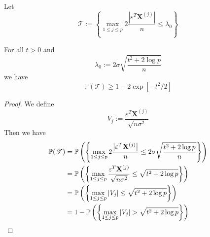 Let
$$\mathscr{T} := \left\{\max _{1 \leq j \leq p} 2 \frac{\left| \varepsilon^{T} \mathbf{X}^{(j)}\right|}{n} \leq \lambda_{0}\right\}$$

\begin{lemma}[Lemma 6.2.]
    For all $t > 0$ and
    $$\lambda_{0}:=2 \sigma \sqrt{\frac{t^{2}+2 \log p}{n}}$$
    we have
    $$\mathbb{P}(\mathscr{T}) \geq 1-2 \exp \left[-t^{2} / 2\right]$$
\end{lemma}
\begin{proof}
    We define
    $$V_{j} := \frac{\varepsilon^{T} \mathbf{X}^{(j)}}{\sqrt{n \sigma^{2}}}$$
    Then we have
    \begin{align*}
        \mathbb{P}(\mathscr{T}) & = \P \left( \left\{\max _{1 \leq j \leq p} 2 \frac{\left| \varepsilon^{T} \mathbf{X}^{(j)}\right|}{n} \leq 2 \sigma \sqrt{\frac{t^{2}+2 \log p}{n}} \right\} \right) \\
                                & =
        \P \left( \left\{\max _{1 \leq j \leq p} \frac{\varepsilon^{T} \mathbf{X}^{(j)}}{\sqrt{n \sigma^{2}}} \leq \sqrt{t^{2}+2 \log p} \right\} \right)                                              \\
                                & =
        \P \left( \left\{\max _{1 \leq j \leq p} | V_{j} | \leq \sqrt{t^{2}+2 \log p} \right\} \right)                                                                                                 \\
                                & =
        1 - \P \left( \left\{\max _{1 \leq j \leq p} | V_{j} | > \sqrt{t^{2}+2 \log p} \right\} \right)                                                                                                \\
    \end{align*}
\end{proof}

